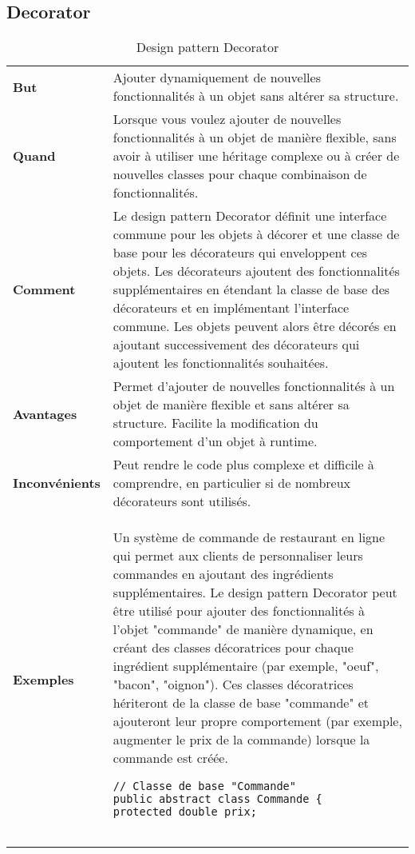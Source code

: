 \newpage
\subsection{Decorator}
\begin{table}[H]
\caption{Design pattern Decorator}
\label{tbl:design_pattern_decorator}
\begin{adjustbox}{max width=\textwidth}
\begin{tabular}{l|p{\textwidth}}
\toprule
\textbf{But} & Ajouter dynamiquement de nouvelles fonctionnalités à un objet sans altérer sa structure.\\
\cmidrule(lr){1-2}
\textbf{Quand} & Lorsque vous voulez ajouter de nouvelles fonctionnalités à un objet de manière flexible, sans avoir à utiliser une héritage complexe ou à créer de nouvelles classes pour chaque combinaison de fonctionnalités.\\
\cmidrule(lr){1-2}
\textbf{Comment} & Le design pattern Decorator définit une interface commune pour les objets à décorer et une classe de base pour les décorateurs qui enveloppent ces objets. Les décorateurs ajoutent des fonctionnalités supplémentaires en étendant la classe de base des décorateurs et en implémentant l'interface commune. Les objets peuvent alors être décorés en ajoutant successivement des décorateurs qui ajoutent les fonctionnalités souhaitées.\\
\cmidrule(lr){1-2}
\textbf{Avantages} & Permet d'ajouter de nouvelles fonctionnalités à un objet de manière flexible et sans altérer sa structure. Facilite la modification du comportement d'un objet à runtime.\\
\cmidrule(lr){1-2}
\textbf{Inconvénients} & Peut rendre le code plus complexe et difficile à comprendre, en particulier si de nombreux décorateurs sont utilisés.\\
\cmidrule(lr){1-2}
\textbf{Exemples} & 
\hspace{4mm}
\begin{minipage}[tl]{0.5\textwidth}
\begin{minipage}[t]{1\textwidth}
Un système de commande de restaurant en ligne qui permet aux clients de personnaliser leurs commandes en ajoutant des ingrédients supplémentaires. Le design pattern Decorator peut être utilisé pour ajouter des fonctionnalités à l'objet "commande" de manière dynamique, en créant des classes décoratrices pour chaque ingrédient supplémentaire (par exemple, "oeuf", "bacon", "oignon"). Ces classes décoratrices hériteront de la classe de base "commande" et ajouteront leur propre comportement (par exemple, augmenter le prix de la commande) lorsque la commande est créée.
\end{minipage}
\begin{minipage}[b]{1\textwidth}
\begin{lstlisting}[style=monstyle]
// Classe de base "Commande"
public abstract class Commande {
protected double prix;


\end{lstlisting}
\end{minipage}
\end{minipage}
\end{tabular}
\end{adjustbox}
\end{table}
